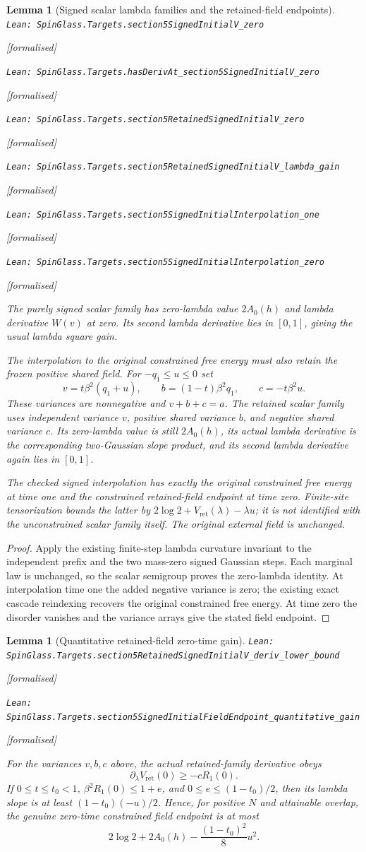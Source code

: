 \documentclass[11pt]{article}
\providecommand{\lean}[1]{\leavevmode\par\nopagebreak
  {\noindent\normalfont\footnotesize\raggedright\texttt{Lean: #1}\par}\nopagebreak}
\providecommand{\leanok}{\par\nopagebreak
  {\noindent\normalfont\footnotesize\textcolor{green!50!black}{[formalised]}\par}\nopagebreak}
\newtheorem{lemma}[theorem]{Lemma}
\begin{document}
\begin{lemma}[Signed scalar lambda families and the retained-field endpoints]
\lean{SpinGlass.Targets.section5SignedInitialV\_zero}\leanok
\lean{SpinGlass.Targets.hasDerivAt\_section5SignedInitialV\_zero}\leanok
\lean{SpinGlass.Targets.section5RetainedSignedInitialV\_zero}\leanok
\lean{SpinGlass.Targets.section5RetainedSignedInitialV\_lambda\_gain}\leanok
\lean{SpinGlass.Targets.section5SignedInitialInterpolation\_one}\leanok
\lean{SpinGlass.Targets.section5SignedInitialInterpolation\_zero}\leanok
The purely signed scalar family has zero-lambda value $2A_0(h)$ and
lambda derivative $W(v)$ at zero. Its second lambda derivative lies in
$[0,1]$, giving the usual lambda square gain.

The interpolation to the original constrained free energy must also retain
the frozen \emph{positive} shared field. For $-q_1\le u\le0$ set
\[
 v=t\beta^2(q_1+u),\qquad b=(1-t)\beta^2q_1,\qquad
 c=-t\beta^2u.
\]
These variances are nonnegative and $v+b+c=a$. The retained scalar family
uses independent variance $v$, positive shared variance $b$, and negative
shared variance $c$. Its zero-lambda value is still $2A_0(h)$, its actual
lambda derivative is the corresponding two-Gaussian slope product, and
its second lambda derivative again lies in $[0,1]$.

The checked signed interpolation has exactly the original constrained
free energy at time one and the constrained retained-field endpoint at time
zero. Finite-site tensorization bounds the latter by
$2\log2+V_{\mathrm{ret}}(\lambda)-\lambda u$; it is not identified with
the unconstrained scalar family itself. The original external field is unchanged.
\end{lemma}
\begin{proof}
Apply the existing finite-step lambda curvature invariant to the independent
prefix and the two mass-zero signed Gaussian steps. Each marginal law is
unchanged, so the scalar semigroup proves the zero-lambda identity.
At interpolation time one the added negative variance is zero; the existing
exact cascade reindexing recovers the original constrained free energy.
At time zero the disorder vanishes and the variance arrays give the stated
field endpoint.
\end{proof}
\begin{lemma}[Quantitative retained-field zero-time gain]
\lean{SpinGlass.Targets.section5RetainedSignedInitialV\_deriv\_lower\_bound}\leanok
\lean{SpinGlass.Targets.section5SignedInitialFieldEndpoint\_quantitative\_gain}\leanok
For the variances $v,b,c$ above, the actual retained-family derivative obeys
\[
 \partial_\lambda V_{\mathrm{ret}}(0)\ge-cR_1(0).
\]
If $0\le t\le t_0<1$, $\beta^2R_1(0)\le1+e$, and
$0\le e\le(1-t_0)/2$, then its lambda slope is at least
$(1-t_0)(-u)/2$. Hence, for positive $N$ and attainable overlap, the genuine
zero-time constrained field endpoint is at most
\[
 2\log2+2A_0(h)-\frac{(1-t_0)^2}{8}u^2.
\]
\end{lemma}
\end{document}
